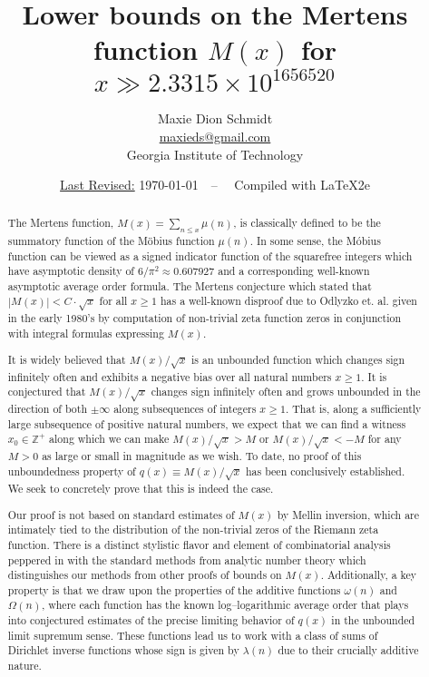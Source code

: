 \documentclass[11pt,reqno,a4letter]{article}
\title{
       \LARGE{
       Lower bounds on the Mertens function $M(x)$ for $x \gg 2.3315 \times 10^{1656520}$ 
       } 
}
\author{{\large Maxie Dion Schmidt} \\ 
        {\normalsize \href{mailto:maxieds@gmail.com}{maxieds@gmail.com}} \\[0.1cm] 
        {\small Georgia Institute of Technology} 
}
\date{\small\underline{Last Revised:} \today\ \ -- \ \ Compiled with \LaTeX2e}
\numberwithin{figure}{section}
\numberwithin{table}{section}
\theoremstyle{plain}
\numberwithin{theorem}{section}
\theoremstyle{definition}
\begin{document}
 

\maketitle

\begin{abstract} 
The Mertens function, $M(x) = \sum_{n \leq x} \mu(n)$, is classically 
defined to be the summatory function of the M\"obius function 
$\mu(n)$. In some sense, the M\'obius function can be viewed as a 
signed indicator function of the squarefree integers which have 
asymptotic density of $6 / \pi^2 \approx 0.607927$ and a corresponding 
well-known asymptotic average order formula. 
The 
Mertens conjecture which stated that $|M(x)| < C \cdot \sqrt{x}$ for all 
$x \geq 1$ has a well-known disproof due to Odlyzko et. al. given in the early 1980's by computation of 
non-trivial zeta function zeros in conjunction with integral formulas expressing $M(x)$. 

It is widely believed that $M(x) / \sqrt{x}$ is an unbounded function 
which changes sign infinitely often and exhibits a negative bias 
over all natural numbers $x \geq 1$. It is conjectured that $M(x) / \sqrt{x}$ changes sign infinitely often and grows 
unbounded in the direction of both $\pm \infty$ along subsequences of integers $x \geq 1$. That is, along a sufficiently 
large subsequence of positive natural numbers, we expect that we can find a witness $x_0 \in \mathbb{Z}^{+}$ along which 
we can make $M(x)/\sqrt{x} > M$ or $M(x)/\sqrt{x} < -M$ 
for any $M > 0$ as large or small in magnitude as we wish. To date, no proof of this 
unboundedness property of $q(x) \equiv M(x)/\sqrt{x}$ has been conclusively established. 
We seek to concretely prove that this is indeed the case. 

Our proof is not based on 
standard estimates of $M(x)$ by Mellin inversion, which are intimately tied to the distribution of the non-trivial 
zeros of the Riemann zeta function. 
There is a distinct stylistic 
flavor and element of combinatorial analysis 
peppered in with the standard methods from analytic number theory which distinguishes 
our methods from other proofs of bounds on $M(x)$. 
Additionally, a key property is that 
we draw upon the properties of the additive functions $\omega(n)$ and $\Omega(n)$, where 
each function has the known log--logarithmic average order that plays into conjectured estimates 
of the precise limiting behavior of $q(x)$ in the unbounded limit supremum sense. 
These functions lead us to work with a class of sums of Dirichlet inverse functions whose 
sign is given by $\lambda(n)$ due to their crucially additive nature. 


\end{abstract}
\end{document}
